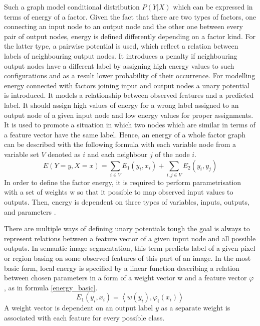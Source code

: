 Such a graph model conditional distribution $P(Y|X)$ which can be expressed in terms of energy of a factor. Given the fact that there are two types of factors, one connecting an input node to an output node and the other one between every pair of output nodes, energy is defined differently depending on a factor kind. For the latter type, a pairwise potential is used, which reflect a relation between labels of neighbouring output nodes. It introduces a penalty if neighbouring output nodes have a different label by assigning high energy values to such configurations and as a result lower probability of their occurrence. For modelling energy connected with factors joining input and output nodes a unary potential is introduced. It models a relationship between observed features and a predicted label. It should assign high values of energy for a wrong label assigned to an output node of a given input node and low energy values for proper assignments. It is used to promote a situation in which two nodes which are similar in terms of a feature vector have the same label. Hence, an energy of a whole factor graph can be described with the following formula with each variable node from a variable set $V$ denoted as $i$ and each neighbour $j$ of the node $i$.
\begin{equation}
    E(Y=y,X=x)=\sum_{i\in V}{E_1}({y_i},{x_i}) + \sum_{i,j\in V}{E_2}({y_i},{y_j})
\end{equation}
In order to define the factor energy, it is required to perform parametrisation with a set of weights w so that it possible to map observed input values to outputs. Then, energy is dependent on three types of variables, inputs, outputs, and parameters \cite{inference_crf}.

There are multiple ways of defining unary potentials tough the goal is always to represent relations between a feature vector of a given input node and all possible outputs. In semantic image segmentation, this term predicts label of a given pixel or region basing on some observed features of this part of an image. In the most basic form, local energy is specified by a linear function describing a relation between chosen parameters in a form of a weight vector w and a feature vector $\varphi$ \cite{Nowozin}, as in formula \ref{energy_basic}.
\begin{equation}
    \label{energy_basic}
    E_1(y_i,x_i)=\left \langle w(y_i),\varphi_i(x_i) \right \rangle
\end{equation}
A weight vector is dependent on an output label $y$ as a separate weight is associated with each feature for every possible class.

